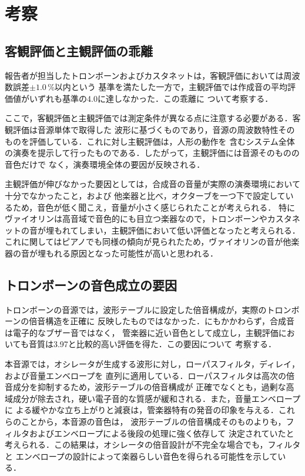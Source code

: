 \section{考察}
\subsection{客観評価と主観評価の乖離}
報告者が担当したトロンボーンおよびカスタネットは，客観評価においては周波数誤差$\pm1.0$\,\%以内という
基準を満たした一方で，主観評価では作成音の平均評価値がいずれも基準の4.0に達しなかった．この乖離に
ついて考察する．

ここで，客観評価と主観評価では測定条件が異なる点に注意する必要がある．客観評価は音源単体で取得した
波形に基づくものであり，音源の周波数特性そのものを評価している．これに対し主観評価は，人形の動作を
含むシステム全体の演奏を提示して行ったものである．したがって，主観評価には音源そのものの音色だけで
なく，演奏環境全体の要因が反映される．

主観評価が伸びなかった要因としては，合成音の音量が実際の演奏環境において十分でなかったこと，および
他楽器と比べ，オクターブを一つ下で設定しているため，音色が低く聞こえ，音量が小さく感じられたことが考えられる．
特にヴァイオリンは高音域で音色的にも目立つ楽器なので，トロンボーンやカスタネットの音が埋もれてしまい，主観評価において低い評価となったと考えられる．
これに関してはピアノでも同様の傾向が見られたため，ヴァイオリンの音が他楽器の音が埋もれる原因となった可能性が高いと思われる．

\subsection{トロンボーンの音色成立の要因}
トロンボーンの音源では，波形テーブルに設定した倍音構成が，実際のトロンボーンの倍音構造を正確に
反映したものではなかった．にもかかわらず，合成音は電子的なブザー音ではなく，
管楽器に近い音色として成立し，主観評価においても音質は3.97と比較的高い評価を得た．この要因について
考察する．

本音源では，オシレータが生成する波形に対し，ローパスフィルタ，ディレイ，および音量エンベロープを
直列に適用している．ローパスフィルタは高次の倍音成分を抑制するため，波形テーブルの倍音構成が
正確でなくとも，過剰な高域成分が除去され，硬い電子音的な質感が緩和される．また，音量エンベロープに
よる緩やかな立ち上がりと減衰は，管楽器特有の発音の印象を与える．これらのことから，本音源の音色は，
波形テーブルの倍音構成そのものよりも，フィルタおよびエンベロープによる後段の処理に強く依存して
決定されていたと考えられる．この結果は，オシレータの倍音設計が不完全な場合でも，フィルタと
エンベロープの設計によって楽器らしい音色を得られる可能性を示している．

